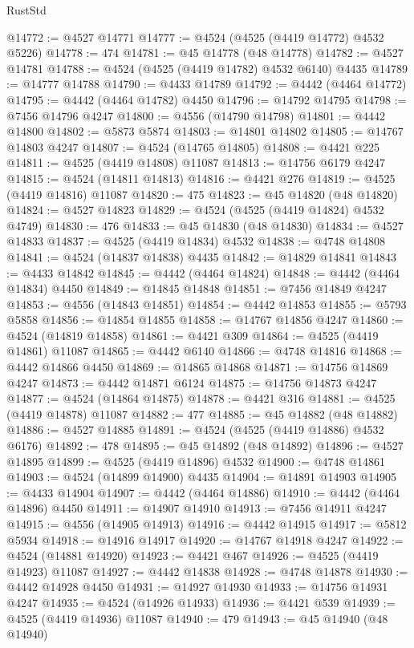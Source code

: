 \begin{lexlean}{RustStd}
\begin{coremodule}
@14772 := @4527 @14771
@14777 := @4524 (@4525 (@4419 @14772) @4532 @5226)
@14778 := 474
@14781 := @45 @14778 (@48 @14778)
@14782 := @4527 @14781
@14788 := @4524 (@4525 (@4419 @14782) @4532 @6140) @4435
@14789 := @14777 @14788
@14790 := @4433 @14789
@14792 := @4442 (@4464 @14772)
@14795 := @4442 (@4464 @14782) @4450
@14796 := @14792 @14795
@14798 := @7456 @14796 @4247
@14800 := @4556 (@14790 @14798)
@14801 := @4442 @14800
@14802 := @5873 @5874
@14803 := @14801 @14802
@14805 := @14767 @14803 @4247
@14807 := @4524 (@14765 @14805)
@14808 := @4421 @225
@14811 := @4525 (@4419 @14808) @11087
@14813 := @14756 @6179 @4247
@14815 := @4524 (@14811 @14813)
@14816 := @4421 @276
@14819 := @4525 (@4419 @14816) @11087
@14820 := 475
@14823 := @45 @14820 (@48 @14820)
@14824 := @4527 @14823
@14829 := @4524 (@4525 (@4419 @14824) @4532 @4749)
@14830 := 476
@14833 := @45 @14830 (@48 @14830)
@14834 := @4527 @14833
@14837 := @4525 (@4419 @14834) @4532
@14838 := @4748 @14808
@14841 := @4524 (@14837 @14838) @4435
@14842 := @14829 @14841
@14843 := @4433 @14842
@14845 := @4442 (@4464 @14824)
@14848 := @4442 (@4464 @14834) @4450
@14849 := @14845 @14848
@14851 := @7456 @14849 @4247
@14853 := @4556 (@14843 @14851)
@14854 := @4442 @14853
@14855 := @5793 @5858
@14856 := @14854 @14855
@14858 := @14767 @14856 @4247
@14860 := @4524 (@14819 @14858)
@14861 := @4421 @309
@14864 := @4525 (@4419 @14861) @11087
@14865 := @4442 @6140
@14866 := @4748 @14816
@14868 := @4442 @14866 @4450
@14869 := @14865 @14868
@14871 := @14756 @14869 @4247
@14873 := @4442 @14871 @6124
@14875 := @14756 @14873 @4247
@14877 := @4524 (@14864 @14875)
@14878 := @4421 @316
@14881 := @4525 (@4419 @14878) @11087
@14882 := 477
@14885 := @45 @14882 (@48 @14882)
@14886 := @4527 @14885
@14891 := @4524 (@4525 (@4419 @14886) @4532 @6176)
@14892 := 478
@14895 := @45 @14892 (@48 @14892)
@14896 := @4527 @14895
@14899 := @4525 (@4419 @14896) @4532
@14900 := @4748 @14861
@14903 := @4524 (@14899 @14900) @4435
@14904 := @14891 @14903
@14905 := @4433 @14904
@14907 := @4442 (@4464 @14886)
@14910 := @4442 (@4464 @14896) @4450
@14911 := @14907 @14910
@14913 := @7456 @14911 @4247
@14915 := @4556 (@14905 @14913)
@14916 := @4442 @14915
@14917 := @5812 @5934
@14918 := @14916 @14917
@14920 := @14767 @14918 @4247
@14922 := @4524 (@14881 @14920)
@14923 := @4421 @467
@14926 := @4525 (@4419 @14923) @11087
@14927 := @4442 @14838
@14928 := @4748 @14878
@14930 := @4442 @14928 @4450
@14931 := @14927 @14930
@14933 := @14756 @14931 @4247
@14935 := @4524 (@14926 @14933)
@14936 := @4421 @539
@14939 := @4525 (@4419 @14936) @11087
@14940 := 479
@14943 := @45 @14940 (@48 @14940)

\end{coremodule}
\end{lexlean}
